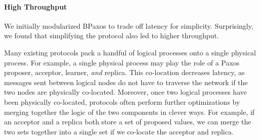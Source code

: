 %
%
%

\paragraph{High Throughput}
We initially modularized BPaxos to trade off latency for simplicity.
Surprisingly, we found that simplifying the protocol also led to higher
throughput.

Many existing protocols pack a handful of logical processes onto a single
physical process. For example, a single physical process may play the role of a
Paxos proposer, acceptor, learner, \emph{and} replica. This co-location
decreases latency, as messages sent between logical nodes do not have to
traverse the network if the two nodes are physically co-located. Moreover, once
two logical processes have been physically co-located, protocols often perform
further optimizations by merging together the logic of the two components in
clever ways. For example, if an acceptor and a replica both store a set of
proposed values, we can merge the two sets together into a single set if we
co-locate the acceptor and replica.

